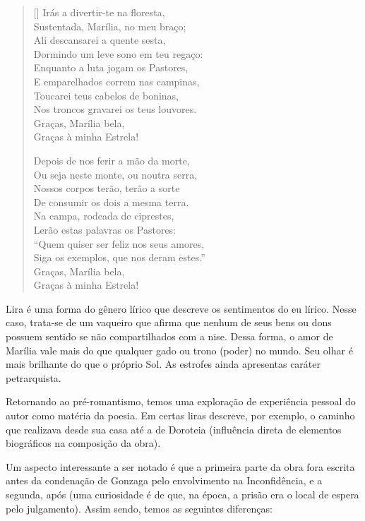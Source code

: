 \begin{verse}[\versewidth]
Irás a divertir-te na floresta, \\
Sustentada, Marília, no meu braço; \\
Ali descansarei a quente sesta, \\
Dormindo um leve sono em teu regaço: \\
Enquanto a luta jogam os Pastores, \\
E emparelhados correm nas campinas, \\
Toucarei teus cabelos de boninas, \\
Nos troncos gravarei os teus louvores. \\
\hspace{2em} Graças, Marília bela, \\
\hspace{2em} Graças à minha Estrela!
					
Depois de nos ferir a mão da morte, \\
Ou seja neste monte, ou noutra serra, \\
Nossos corpos terão, terão a sorte \\
De consumir os dois a mesma terra. \\
Na campa, rodeada de ciprestes, \\
Lerão estas palavras os Pastores: \\
“Quem quiser ser feliz nos seus amores, \\
Siga os exemplos, que nos deram estes.” \\
\hspace{2em} Graças, Marília bela, \\
\hspace{2em} Graças à minha Estrela! \\
\end{verse}

Lira é uma forma do gênero lírico que descreve os sentimentos do eu lírico. Nesse caso, trata-se de um vaqueiro que afirma que nenhum de seus bens ou dons possuem sentido se não compartilhados com a nise. Dessa forma, o amor de Marília vale mais do que qualquer gado ou trono (poder) no mundo. Seu olhar é mais brilhante do que o próprio Sol. As estrofes ainda apresentas caráter petrarquista.

Retornando ao pré-romantismo, temos uma exploração de experiência pessoal do autor como matéria da poesia. Em certas liras descreve, por exemplo, o caminho que realizava desde sua casa até a de Doroteia (influência direta de elementos biográficos na composição da obra).

Um aspecto interessante a ser notado é que a primeira parte da obra fora escrita antes da condenação de Gonzaga pelo envolvimento na Inconfidência, e a segunda, após (uma curiosidade é de que, na época, a prisão era o local de espera pelo julgamento). Assim sendo, temos as seguintes diferenças:

